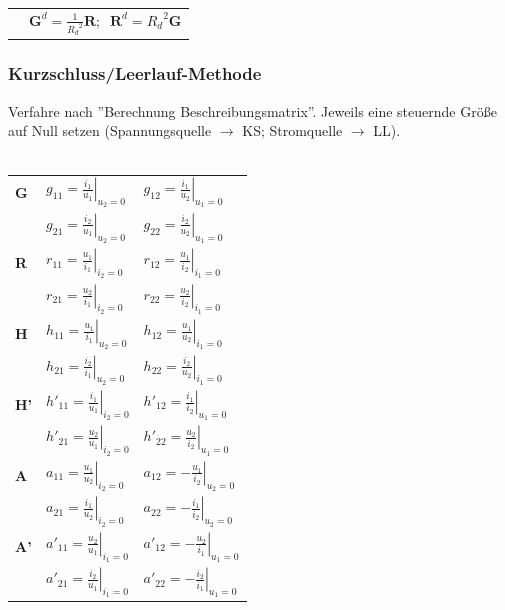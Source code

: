 \documentclass[a4paper,twocolumn,10pt]{article}
\begin{document}
\begin{tabular}{p{20mm}l}
& $\textbf{G}^d=\frac{1}{{R_d}^2}\textbf{R};\;\;\textbf{R}^d={R_d}^2\textbf{G}$
\end{tabular}

\subsubsection*{Kurzschluss/Leerlauf-Methode}
Verfahre nach ''Berechnung Beschreibungsmatrix''. 
Jeweils eine steuernde Größe auf Null setzen (Spannungsquelle $\rightarrow$ KS; Stromquelle $\rightarrow$ LL).\\\\
\begin{tabular}{lll}
	\textbf{G} & $g_{11}=\left.\frac{i_1}{u_1}\right|_{u_2=0}$ & $g_{12}=\left.\frac{i_1}{u_2}\right|_{u_1=0}$\\
	& $g_{21}=\left.\frac{i_2}{u_1}\right|_{u_2=0}$ & $g_{22}=\left.\frac{i_2}{u_2}\right|_{u_1=0}$\\
	\textbf{R} & $r_{11}=\left.\frac{u_1}{i_1}\right|_{i_2=0}$ & $r_{12}=\left.\frac{u_1}{i_2}\right|_{i_1=0}$\\
	& $r_{21}=\left.\frac{u_2}{i_1}\right|_{i_2=0}$ & $r_{22}=\left.\frac{u_2}{i_2}\right|_{i_1=0}$\\
	\textbf{H} & $h_{11}=\left.\frac{u_1}{i_1}\right|_{u_2=0}$ & $h_{12}=\left.\frac{u_1}{u_2}\right|_{i_1=0}$\\
	& $h_{21}=\left.\frac{i_2}{i_1}\right|_{u_2=0}$ & $h_{22}=\left.\frac{i_2}{u_2}\right|_{i_1=0}$\\
	\textbf{H'} & $h'_{11}=\left.\frac{i_1}{u_1}\right|_{i_2=0}$ & $h'_{12}=\left.\frac{i_1}{i_2}\right|_{u_1=0}$\\
	& $h'_{21}=\left.\frac{u_2}{u_1}\right|_{i_2=0}$ & $h'_{22}=\left.\frac{u_2}{i_2}\right|_{u_1=0}$\\
	\textbf{A} & $a_{11}=\left.\frac{u_1}{u_2}\right|_{i_2=0}$ & $a_{12}=\left.-\frac{u_1}{i_2}\right|_{u_2=0}$\\
	& $a_{21}=\left.\frac{i_1}{u_2}\right|_{i_2=0}$ & $a_{22}=\left.-\frac{i_1}{i_2}\right|_{u_2=0}$\\
	\textbf{A'} & $a'_{11}=\left.\frac{u_2}{u_1}\right|_{i_1=0}$ & $a'_{12}=\left.-\frac{u_2}{i_1}\right|_{u_1=0}$\\
	& $a'_{21}=\left.\frac{i_2}{u_1}\right|_{i_1=0}$ & $a'_{22}=\left.-\frac{i_2}{i_1}\right|_{u_1=0}$
\end{tabular}
\end{document}

